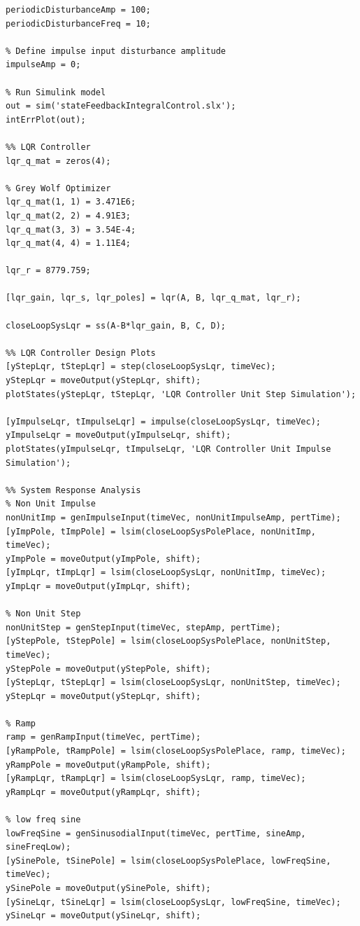\documentclass[titlepage]{article}
\begin{document}
\begin{lstlisting}[style=Matlab-editor]
% Define periodic input disturbance amplitude and frequency
periodicDisturbanceAmp = 100;
periodicDisturbanceFreq = 10;

% Define impulse input disturbance amplitude
impulseAmp = 0;

% Run Simulink model
out = sim('stateFeedbackIntegralControl.slx');
intErrPlot(out);

%% LQR Controller
lqr_q_mat = zeros(4);

% Grey Wolf Optimizer
lqr_q_mat(1, 1) = 3.471E6;
lqr_q_mat(2, 2) = 4.91E3;
lqr_q_mat(3, 3) = 3.54E-4;
lqr_q_mat(4, 4) = 1.11E4;

lqr_r = 8779.759;

[lqr_gain, lqr_s, lqr_poles] = lqr(A, B, lqr_q_mat, lqr_r);

closeLoopSysLqr = ss(A-B*lqr_gain, B, C, D);

%% LQR Controller Design Plots
[yStepLqr, tStepLqr] = step(closeLoopSysLqr, timeVec);
yStepLqr = moveOutput(yStepLqr, shift);
plotStates(yStepLqr, tStepLqr, 'LQR Controller Unit Step Simulation');

[yImpulseLqr, tImpulseLqr] = impulse(closeLoopSysLqr, timeVec);
yImpulseLqr = moveOutput(yImpulseLqr, shift);
plotStates(yImpulseLqr, tImpulseLqr, 'LQR Controller Unit Impulse Simulation');

%% System Response Analysis
% Non Unit Impulse
nonUnitImp = genImpulseInput(timeVec, nonUnitImpulseAmp, pertTime);
[yImpPole, tImpPole] = lsim(closeLoopSysPolePlace, nonUnitImp, timeVec);
yImpPole = moveOutput(yImpPole, shift);
[yImpLqr, tImpLqr] = lsim(closeLoopSysLqr, nonUnitImp, timeVec);
yImpLqr = moveOutput(yImpLqr, shift);

% Non Unit Step
nonUnitStep = genStepInput(timeVec, stepAmp, pertTime);
[yStepPole, tStepPole] = lsim(closeLoopSysPolePlace, nonUnitStep, timeVec);
yStepPole = moveOutput(yStepPole, shift);
[yStepLqr, tStepLqr] = lsim(closeLoopSysLqr, nonUnitStep, timeVec);
yStepLqr = moveOutput(yStepLqr, shift);

% Ramp
ramp = genRampInput(timeVec, pertTime);
[yRampPole, tRampPole] = lsim(closeLoopSysPolePlace, ramp, timeVec);
yRampPole = moveOutput(yRampPole, shift);
[yRampLqr, tRampLqr] = lsim(closeLoopSysLqr, ramp, timeVec);
yRampLqr = moveOutput(yRampLqr, shift);

% low freq sine
lowFreqSine = genSinusodialInput(timeVec, pertTime, sineAmp, sineFreqLow);
[ySinePole, tSinePole] = lsim(closeLoopSysPolePlace, lowFreqSine, timeVec);
ySinePole = moveOutput(ySinePole, shift);
[ySineLqr, tSineLqr] = lsim(closeLoopSysLqr, lowFreqSine, timeVec);
ySineLqr = moveOutput(ySineLqr, shift);


\end{lstlisting}
\end{document}
